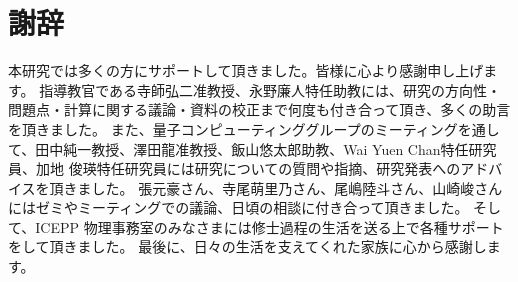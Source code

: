\chapter*{謝辞}

本研究では多くの方にサポートして頂きました。皆様に心より感謝申し上げます。
指導教官である寺師弘二准教授、永野廉人特任助教には、研究の方向性・問題点・計算に関する議論・資料の校正まで何度も付き合って頂き、多くの助言を頂きました。
また、量子コンピューティンググループのミーティングを通して、田中純一教授、澤田龍准教授、飯山悠太郎助教、Wai Yuen Chan特任研究員、加地 俊瑛特任研究員には研究についての質問や指摘、研究発表へのアドバイスを頂きました。
張元豪さん、寺尾萌里乃さん、尾嶋陸斗さん、山崎峻さんにはゼミやミーティングでの議論、日頃の相談に付き合って頂きました。
そして、ICEPP 物理事務室のみなさまには修士過程の生活を送る上で各種サポートをして頂きました。
最後に、日々の生活を支えてくれた家族に心から感謝します。

